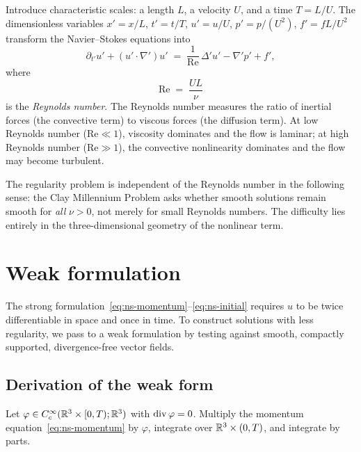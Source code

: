 Introduce characteristic scales: a length $L$, a velocity $U$, and a time $T = L/U$.
The dimensionless variables $x' = x/L$, $t' = t/T$, $u' = u/U$, $p' = p/(U^{2})$,
$f' = fL/U^{2}$ transform the Navier--Stokes equations into
\begin{equation}\label{eq:ns-dimensionless}
  \partial_{t'} u' + (u' \cdot \nabla') u'
  \;=\;
  \frac{1}{\mathrm{Re}}\,\Delta' u' - \nabla' p' + f',
\end{equation}
where
\begin{equation}\label{eq:reynolds}
  \mathrm{Re}
  \;=\;
  \frac{UL}{\nu}
\end{equation}
is the \emph{Reynolds number}.  The Reynolds number measures the ratio of inertial forces
(the convective term) to viscous forces (the diffusion term).  At low Reynolds number
($\mathrm{Re} \ll 1$), viscosity dominates and the flow is laminar; at high Reynolds
number ($\mathrm{Re} \gg 1$), the convective nonlinearity dominates and the flow may
become turbulent.

\begin{remark}
  The regularity problem is independent of the Reynolds number in the following sense:
  the Clay Millennium Problem asks whether smooth solutions remain smooth for \emph{all}
  $\nu > 0$, not merely for small Reynolds numbers.  The difficulty lies entirely in the
  three-dimensional geometry of the nonlinear term.
\end{remark}

\section{Weak formulation}\label{sec:ns-weak}

The strong formulation~\eqref{eq:ns-momentum}--\eqref{eq:ns-initial} requires $u$ to be
twice differentiable in space and once in time.  To construct solutions with less
regularity, we pass to a weak formulation by testing against smooth, compactly
supported, divergence-free vector fields.

\subsection{Derivation of the weak form}

Let $\varphi \in C^\infty_c(\mathbb{R}^{3} \times [0, T); \mathbb{R}^{3})$ with
$\operatorname{div} \varphi = 0$.  Multiply the momentum equation~\eqref{eq:ns-momentum} by
$\varphi$, integrate over $\mathbb{R}^{3} \times (0, T)$, and integrate by parts.

